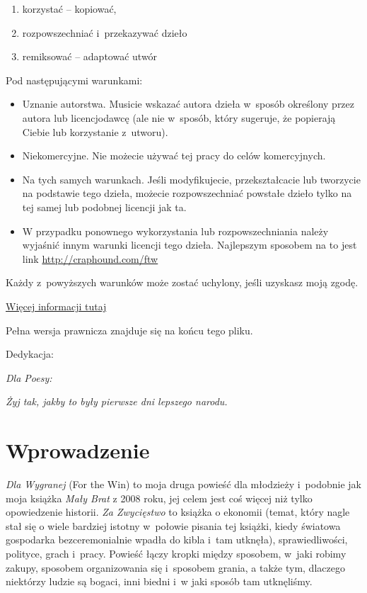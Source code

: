 \documentclass[oneside,polish,11pt,rmheadings]{mwbk}
\begin{document}
\begin{enumerate}
\item korzystać -- kopiować, 
\item rozpowszechniać i~przekazywać dzieło 
\item  remiksować -- adaptować utwór 
\end{enumerate}


Pod następującymi warunkami: 
\begin{itemize}
\item Uznanie autorstwa. Musicie wskazać autora dzieła w~sposób określony przez autora lub licencjodawcę (ale nie w~sposób, który sugeruje, że popierają Ciebie lub korzystanie z~utworu). 
\item  Niekomercyjne. Nie możecie używać tej pracy do celów komercyjnych. 
\item  Na tych samych warunkach. Jeśli modyfikujecie, przekształcacie lub tworzycie na podstawie tego dzieła, możecie rozpowszechniać powstałe dzieło tylko na tej samej lub podobnej licencji jak ta.
\item  W przypadku ponownego wykorzystania lub rozpowszechniania należy wyjaśnić innym warunki licencji tego dzieła. Najlepszym sposobem na to jest link \url{http://craphound.com/ftw}
\end{itemize}

\begin{center}


\noindent Każdy z~powyższych warunków może zostać uchylony, jeśli uzyskasz moją zgodę. 

\noindent \href{http://creativecommons.org/licenses/by-nc-sa/3.0/}{Więcej informacji tutaj} 

\noindent Pełna wersja prawnicza znajduje się na końcu tego pliku. 
\end{center}

\newpage

\begin{flushright}
Dedykacja:
\medskip 

\textit{Dla Poesy:}

\textit{Żyj tak, jakby to były pierwsze dni lepszego narodu. }
\end{flushright}

\bigskip


\chapter*{Wprowadzenie}


\textit{Dla Wygranej} (For the Win) to moja druga powieść dla młodzieży i~podobnie jak moja książka \textit{Mały Brat }z 2008 roku, jej celem jest coś więcej niż tylko opowiedzenie historii. \textit{Za Zwycięstwo }to książka o ekonomii (temat, który nagle stał się o wiele bardziej istotny w~połowie pisania tej książki, kiedy światowa gospodarka bezceremonialnie wpadła do kibla i~tam utknęła), sprawiedliwości, polityce, grach i~pracy. Powieść łączy kropki między sposobem, w~jaki robimy zakupy, sposobem organizowania się i~sposobem grania, a także tym, dlaczego niektórzy ludzie są bogaci, inni biedni i~w jaki sposób tam utknęliśmy. 
\end{document}

